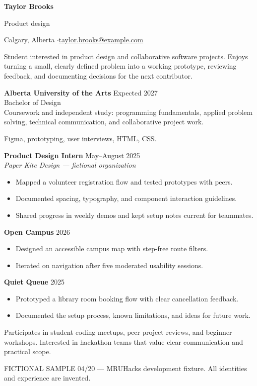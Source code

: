 
{\Huge\bfseries Taylor Brooks}\par
{\large\color{accent} Product design}\par
Calgary, Alberta \enspace$\cdot$\enspace \href{mailto:taylor.brooks@example.com}{taylor.brooks@example.com}

Student interested in product design and collaborative software projects.
Enjoys turning a small, clearly defined problem into a working prototype,
reviewing feedback, and documenting decisions for the next contributor.

\textbf{Alberta University of the Arts} \hfill Expected 2027\\
Bachelor of Design\\
Coursework and independent study: programming fundamentals, applied problem solving,
technical communication, and collaborative project work.

Figma, prototyping, user interviews, HTML, CSS.

\textbf{Product Design Intern} \hfill May--August 2025\\
\textit{Paper Kite Design --- fictional organization}
\begin{itemize}
\item Mapped a volunteer registration flow and tested prototypes with peers.
\item Documented spacing, typography, and component interaction guidelines.
\item Shared progress in weekly demos and kept setup notes current for teammates.
\end{itemize}

\textbf{Open Campus} \hfill 2026
\begin{itemize}
\item Designed an accessible campus map with step-free route filters.
\item Iterated on navigation after five moderated usability sessions.
\end{itemize}
\textbf{Quiet Queue} \hfill 2025
\begin{itemize}
\item Prototyped a library room booking flow with clear cancellation feedback.
\item Documented the setup process, known limitations, and ideas for future work.
\end{itemize}

Participates in student coding meetups, peer project reviews, and beginner workshops.
Interested in hackathon teams that value clear communication and practical scope.

\vfill
{\footnotesize\color{gray} FICTIONAL SAMPLE 04/20 --- MRUHacks development fixture.
All identities and experience are invented.}

